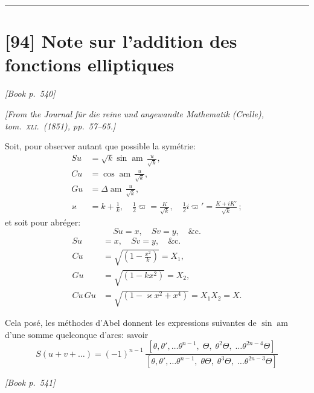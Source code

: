 \documentclass[11pt]{article}
\begin{document}
\bigskip
\hrule
\bigskip


\section*{[94] Note sur l'addition des fonctions elliptiques}

\noindent\textit{[Book p.~540]}\hfill

\smallskip

\noindent\emph{[From the Journal f\"ur die reine und angewandte Mathematik (Crelle), tom.~\textsc{xli}.\ (1851), pp.~57--65.]}

\medskip

\noindent Soit, pour observer autant que possible la sym\'etrie:
\[
\begin{aligned}
Su &= \sqrt{k}\sin\operatorname{am}\,\tfrac{u}{\sqrt{k}},\\
Cu &= \cos\operatorname{am}\,\tfrac{u}{\sqrt{k}},\\
Gu &= \Delta\operatorname{am}\,\tfrac{u}{\sqrt{k}},\\
\varkappa &= k + \tfrac{1}{k},\quad \tfrac{1}{2}\varpi = \tfrac{K}{\sqrt{k}},\quad \tfrac{1}{2}i\varpi' = \tfrac{K + iK'}{\sqrt{k}}\,;
\end{aligned}
\]
et soit pour abr\'eger:
\[
Su = x,\quad Sv = y,\quad \&\text{c.}
\]
\[
\begin{aligned}
Su &= x,\quad Sv = y,\quad \&\text{c.}\\
Cu &= \sqrt{(1 - \tfrac{x^{2}}{k})} = X_{1},\\
Gu &= \sqrt{(1 - kx^{2})} = X_{2},\\
Cu\,Gu &= \sqrt{(1 - \varkappa x^{2} + x^{4})} = X_{1}X_{2} = X.
\end{aligned}
\]

Cela pos\'e, les m\'ethodes d'Abel donnent les expressions suivantes de $\sin\operatorname{am}$ d'une somme quelconque d'arcs: savoir
\[
S(u + v + \dots) = (-1)^{n-1}\,\frac{[\theta,\theta',\dots\theta^{n-1},\;\Theta,\;\theta^{2}\Theta,\;\dots\theta^{2n-4}\Theta]}{[\theta,\theta',\dots\theta^{n-1},\;\theta\Theta,\;\theta^{3}\Theta,\;\dots\theta^{2n-3}\Theta]}
\]

\medskip
\noindent\textit{[Book p.~541]}\hfill

\smallskip
\end{document}
